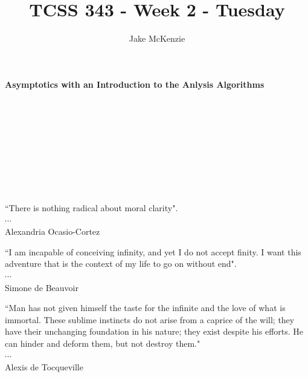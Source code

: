 \documentclass[12pt]{article}
\begin{document}
\title{TCSS 343 - Week 2 - Tuesday}
\author{Jake McKenzie}
\maketitle
\noindent\centerline{\textbf{Asymptotics with an Introduction to the Anlysis Algorithms}}\\\\\\\\\\\\\\\\
\begin{center}
    ``There is nothing radical about moral clarity". \\$\cdots$\\ Alexandria Ocasio-Cortez
\end{center}
\begin{center}
    ``I am incapable of conceiving infinity, and yet I do not accept finity. I want this adventure that is the context of my life to go on without end". \\$\cdots$\\ Simone de Beauvoir
\end{center}
\begin{center}
    ``Man has not given himself the taste for the infinite and the love of what is immortal. These sublime instincts do not arise from a caprice of the will; they have their unchanging foundation in his nature; they exist despite his efforts. He can hinder and deform them, but not destroy them."\\
    $\cdots$\\
    Alexis de Tocqueville
\end{center}
\newpage
\end{document}
